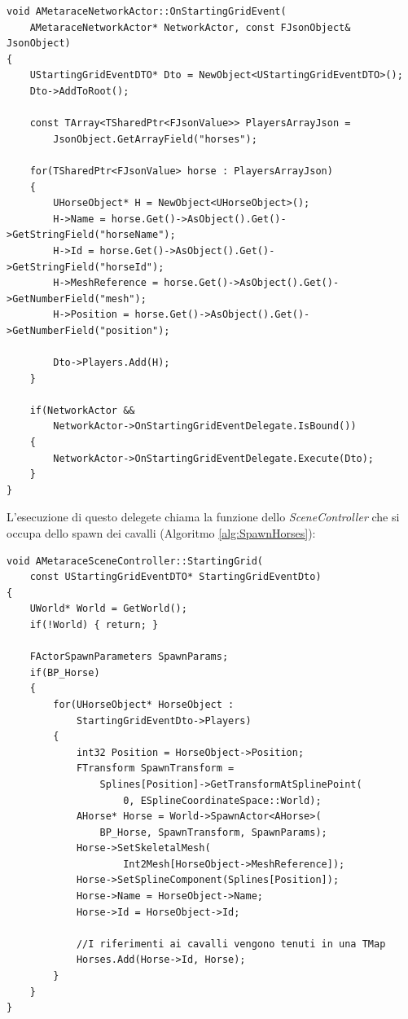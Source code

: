         \begin{lstlisting}[caption = Funzione che spacchetta il file Json per la griglia iniziale, label = {alg:StartingGrid}]
void AMetaraceNetworkActor::OnStartingGridEvent(
    AMetaraceNetworkActor* NetworkActor, const FJsonObject& JsonObject)
{
    UStartingGridEventDTO* Dto = NewObject<UStartingGridEventDTO>();
    Dto->AddToRoot();

    const TArray<TSharedPtr<FJsonValue>> PlayersArrayJson = 
        JsonObject.GetArrayField("horses");
    
    for(TSharedPtr<FJsonValue> horse : PlayersArrayJson)
    {		
        UHorseObject* H = NewObject<UHorseObject>();
        H->Name = horse.Get()->AsObject().Get()->GetStringField("horseName");
        H->Id = horse.Get()->AsObject().Get()->GetStringField("horseId");
        H->MeshReference = horse.Get()->AsObject().Get()->GetNumberField("mesh");
        H->Position = horse.Get()->AsObject().Get()->GetNumberField("position");
        
        Dto->Players.Add(H);
    }

    if(NetworkActor && 
        NetworkActor->OnStartingGridEventDelegate.IsBound())
    {
        NetworkActor->OnStartingGridEventDelegate.Execute(Dto);
    }
}            
        \end{lstlisting}

        L'esecuzione di questo delegete chiama la funzione dello \textit{SceneController} che si occupa dello spawn dei cavalli (Algoritmo \ref{alg:SpawnHorses}):

        \begin{lstlisting}[caption = Funzione in \textit{SceneController} che fa comparire i cavalli, label={alg:SpawnHorses}]
void AMetaraceSceneController::StartingGrid(
    const UStartingGridEventDTO* StartingGridEventDto)
{
    UWorld* World = GetWorld();
    if(!World) { return; }
    
    FActorSpawnParameters SpawnParams;
    if(BP_Horse)
    {
        for(UHorseObject* HorseObject : 
            StartingGridEventDto->Players)
        {
            int32 Position = HorseObject->Position;
            FTransform SpawnTransform = 
                Splines[Position]->GetTransformAtSplinePoint(
                    0, ESplineCoordinateSpace::World);
            AHorse* Horse = World->SpawnActor<AHorse>(
                BP_Horse, SpawnTransform, SpawnParams);
            Horse->SetSkeletalMesh(
                    Int2Mesh[HorseObject->MeshReference]);
            Horse->SetSplineComponent(Splines[Position]);
            Horse->Name = HorseObject->Name;
            Horse->Id = HorseObject->Id;
                        
            //I riferimenti ai cavalli vengono tenuti in una TMap
            Horses.Add(Horse->Id, Horse);
        }
    }
}
        \end{lstlisting}


